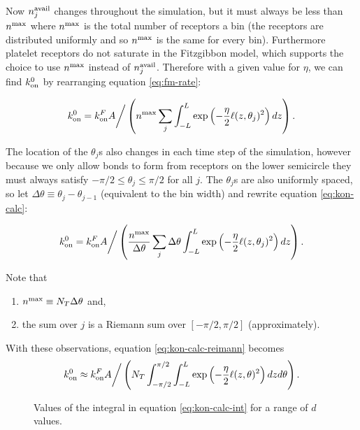 \documentclass{article}
\newcommand{\tn}{\textnormal}
\begin{document}
Now $n_j^\tn{avail}$ changes throughout the simulation, but it must
always be less than $n^\tn{max}$ where $n^\tn{max}$ is the total
number of receptors a bin (the receptors are distributed uniformly and
so $n^\tn{max}$ is the same for every bin). Furthermore platelet
receptors do not saturate in the Fitzgibbon model, which supports the
choice to use $n^\tn{max}$ instead of $n_j^\tn{avail}$. Therefore with
a given value for $\eta$, we can find $\onConst$ by rearranging
equation \eqref{eq:fm-rate}:

\begin{equation}
  \label{eq:kon-calc}
  \onConst = k_\tn{on}^F A \bigg/ \left( n^\tn{max} \sum_j \int_{-L}^{L}
    \exp \left(-\frac{\eta}{2} \ell(z, \theta_j)^2 \right) dz \right).
\end{equation}

The location of the $\theta_j$s also changes in each time step of the
simulation, however because we only allow bonds to form from receptors
on the lower semicircle they must always satisfy $-\pi/2 \le \theta_j
\le \pi/2$ for all $j$. The $\theta_j$s are also uniformly spaced, so
let $\Delta \theta \equiv \theta_j - \theta_{j-1}$ (equivalent to the
bin width) and rewrite equation \eqref{eq:kon-calc}:

\begin{equation}
  \label{eq:kon-calc-reimann}
  \onConst = k_\tn{on}^F A \bigg/ \left(\frac{n^\tn{max}}{\Delta
      \theta} \sum_j \Delta \theta \int_{-L}^{L}
    \exp\left(-\frac{\eta}{2} \ell(z, \theta_j)^2 \right) dz \right).
\end{equation}

Note that
\begin{enumerate}
\item $n^\tn{max} \equiv N_T \Delta \theta$ and,
\item the sum over $j$ is a Riemann sum over $[-\pi/2, \pi/2]$
  (approximately). 
\end{enumerate}
With these observations, equation \eqref{eq:kon-calc-reimann} becomes
\begin{equation}
  \label{eq:kon-calc-int}
  \onConst \approx k_\tn{on}^F A \bigg/ \left(N_T
    \int_{-\pi/2}^{\pi/2} \int_{-L}^{L} \exp \left(-\frac{\eta}{2}
      \ell(z, \theta)^2 \right) dz d\theta \right).
\end{equation}

\begin{figure}
  \centering
  \caption{Values of the integral in equation \eqref{eq:kon-calc-int}
    for a range of $d$ values.}
  \label{fig:int-vals}
\end{figure}
\end{document}
